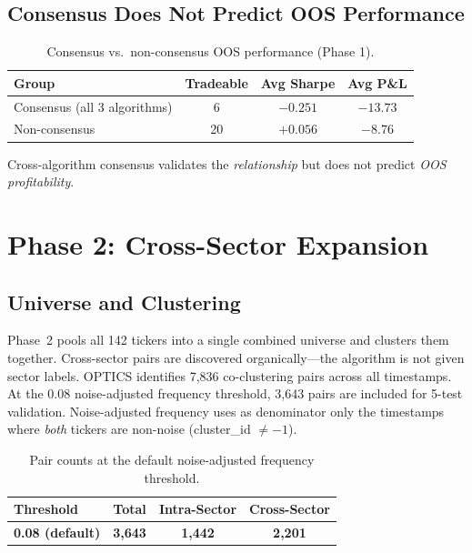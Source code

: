 \documentclass[11pt, a4paper]{article}
\begin{document}
\subsection{Consensus Does Not Predict OOS Performance}

\begin{table}[H]
\centering
\caption{Consensus vs.\ non-consensus OOS performance (Phase 1).}
\begin{tabular}{@{}lccc@{}}
\toprule
\textbf{Group} & \textbf{Tradeable} & \textbf{Avg Sharpe} & \textbf{Avg P\&L} \\
\midrule
Consensus (all 3 algorithms)     & 6  & $-0.251$ & $-13.73$ \\
Non-consensus                     & 20 & $+0.056$ & $-8.76$ \\
\bottomrule
\end{tabular}
\label{tab:consensus-oos}
\end{table}

Cross-algorithm consensus validates the \textit{relationship} but does not predict \textit{OOS profitability}.

\section{Phase 2: Cross-Sector Expansion}

\subsection{Universe and Clustering}

Phase~2 pools all 142 tickers into a single combined universe and clusters them together. Cross-sector pairs are discovered organically---the algorithm is not given sector labels. OPTICS identifies 7,836 co-clustering pairs across all timestamps. At the 0.08 noise-adjusted frequency threshold, 3,643 pairs are included for 5-test validation. Noise-adjusted frequency uses as denominator only the timestamps where \textit{both} tickers are non-noise (cluster\_id $\neq -1$).

\begin{table}[H]
\centering
\caption{Pair counts at the default noise-adjusted frequency threshold.}
\begin{tabular}{@{}lccc@{}}
\toprule
\textbf{Threshold} & \textbf{Total} & \textbf{Intra-Sector} & \textbf{Cross-Sector} \\
\midrule
\textbf{0.08 (default)} & \textbf{3,643} & \textbf{1,442} & \textbf{2,201} \\
\bottomrule
\end{tabular}
\label{tab:freq-thresholds}
\end{table}
\end{document}

